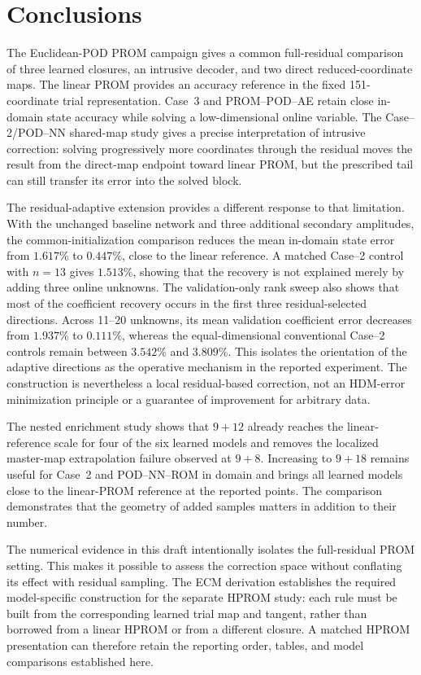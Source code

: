 \documentclass[11pt]{article}
\begin{document}
\section{Conclusions}
The Euclidean-POD PROM campaign gives a common full-residual comparison of
three learned closures, an intrusive decoder, and two direct
reduced-coordinate maps.  The linear PROM provides an accuracy reference in
the fixed 151-coordinate trial representation.  Case~3 and PROM--POD--AE
retain close in-domain state accuracy while solving a low-dimensional online
variable.  The Case--2/POD--NN shared-map study gives a precise interpretation
of intrusive correction: solving progressively more coordinates through the
residual moves the result from the direct-map endpoint toward linear PROM, but
the prescribed tail can still transfer its error into the solved block.

The residual-adaptive extension provides a different response to that
limitation.  With the unchanged baseline network and three additional
secondary amplitudes, the common-initialization comparison reduces the
mean in-domain state error from $1.617\%$ to $0.447\%$, close to the
linear reference.  A matched Case--2 control with $n=13$ gives $1.513\%$,
showing that the recovery is not explained merely by adding three online
unknowns.  The validation-only rank sweep also shows that most of the
coefficient recovery occurs in the first three residual-selected directions.
Across 11--20 unknowns, its mean validation coefficient error decreases from
$1.937\%$ to $0.111\%$, whereas the equal-dimensional conventional Case--2
controls remain between $3.542\%$ and $3.809\%$.  This isolates the
orientation of the adaptive directions as the operative mechanism in the
reported experiment.  The construction is nevertheless a local
residual-based correction, not an HDM-error minimization principle or a
guarantee of improvement for arbitrary data.

The nested enrichment study shows that $9+12$ already reaches the
linear-reference scale for four of the six learned models and removes the
localized master-map extrapolation failure observed at $9+8$.  Increasing to
$9+18$ remains useful for Case~2 and POD--NN--ROM in domain and brings all
learned models close to the linear-PROM reference at the reported points.
The comparison demonstrates that the geometry of added samples matters in
addition to their number.

The numerical evidence in this draft intentionally isolates the full-residual
PROM setting.  This makes it possible to assess the correction space without
conflating its effect with residual sampling.  The ECM derivation establishes
the required model-specific construction for the separate HPROM study: each
rule must be built from the corresponding learned trial map and tangent,
rather than borrowed from a linear HPROM or from a different closure.  A
matched HPROM presentation can therefore retain the reporting order, tables,
and model comparisons established here.
\end{document}
